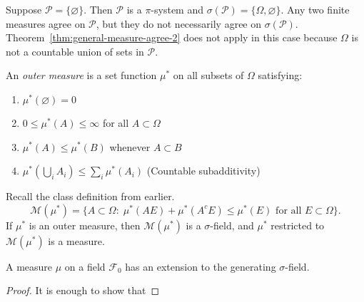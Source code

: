 \documentclass[11pt,fleqn]{book} %
\begin{document}
\begin{example} \label{ex:2.2}
	Suppose $\mathcal{P} = \{\varnothing\}$. Then $\mathcal{P}$ is a $\pi$-system and $\sigma(\mathcal{P}) = \{\Omega,\varnothing\}$. Any two finite measures agree on $\mathcal{P}$, but they do not necessarily agree on $\sigma(\mathcal{P})$. Theorem~\ref{thm:general-measure-agree-2} does not apply in this case because $\Omega$ is not a countable union of sets in $\mathcal{P}$.
\end{example}

\begin{definition} \label{def:outer-measure}
	An \emph{outer measure} is a set function $\mu^*$ on all subsets of $\Omega$ satisfying:
	\begin{enumerate}[label=(\roman*)]
		\item $\mu^*(\varnothing) = 0$
		\item $0 \leq \mu^*(A) \leq \infty$ for all $A \subset \Omega$
		\item $\mu^*(A) \leq \mu^*(B)$ whenever $A \subset B$
		\item $\mu^*(\bigcup_i A_i) \leq \sum_i \mu^*(A_i)$ (Countable subadditivity)
	\end{enumerate}
\end{definition}

\begin{theorem} \label{thm:outer-measure}
	Recall the class definition from earlier.
	\[
		\mathcal{M}(\mu^*) = \{A \subset \Omega:\;\mu^*(AE) + \mu^*(A^cE) \leq \mu^*(E) \textrm{ for all } E \subset \Omega\}.
	\]
	If $\mu^*$ is an outer measure, then $\mathcal{M}(\mu^*)$ is a $\sigma$-field, and $\mu^*$ restricted to $\mathcal{M}(\mu^*)$ is a measure.
\end{theorem}

\begin{theorem} \label{thm:general-measure-extension}
	A measure $\mu$ on a field $\mathcal{F}_0$ has an extension to the generating $\sigma$-field.
\end{theorem}

\begin{proof}
	It is enough to show that 
\end{proof}

\end{document}
